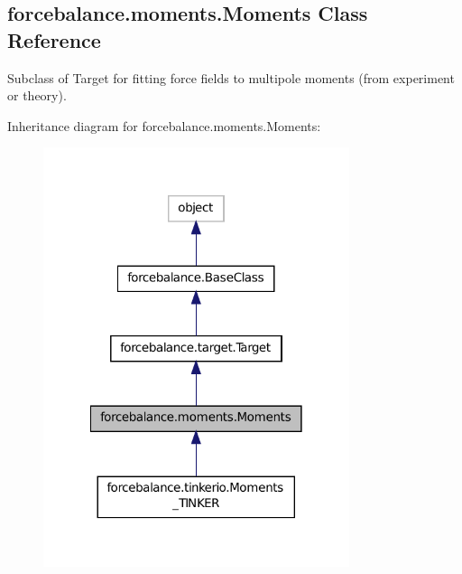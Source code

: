 \hypertarget{classforcebalance_1_1moments_1_1Moments}{\subsection{forcebalance.\-moments.\-Moments Class Reference}
\label{classforcebalance_1_1moments_1_1Moments}
}


Subclass of Target for fitting force fields to multipole moments (from experiment or theory).  




Inheritance diagram for forcebalance.\-moments.\-Moments\-:\nopagebreak
\begin{figure}[H]
\begin{center}
\leavevmode
\includegraphics[width=254pt]{classforcebalance_1_1moments_1_1Moments__inherit__graph}
\end{center}
\end{figure}


